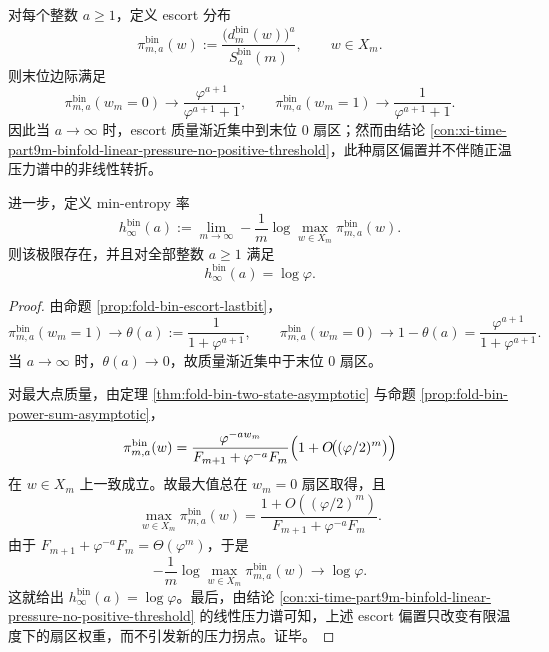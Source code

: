 \begin{conclusion}\label{con:xi-time-part9m-binfold-escort-soft-freezing-minentropy}
对每个整数 \(a\ge 1\)，定义 escort 分布
\[
\pi_{m,a}^{\mathrm{bin}}(w):=
\frac{\bigl(d_m^{\mathrm{bin}}(w)\bigr)^a}{S_a^{\mathrm{bin}}(m)},
\qquad
w\in X_m.
\]
则末位边际满足
\[
\pi_{m,a}^{\mathrm{bin}}(w_m=0)\longrightarrow \frac{\varphi^{a+1}}{\varphi^{a+1}+1},
\qquad
\pi_{m,a}^{\mathrm{bin}}(w_m=1)\longrightarrow \frac{1}{\varphi^{a+1}+1}.
\]
因此当 \(a\to\infty\) 时，escort 质量渐近集中到末位 \(0\) 扇区；然而由结论 \ref{con:xi-time-part9m-binfold-linear-pressure-no-positive-threshold}，此种扇区偏置并不伴随正温压力谱中的非线性转折。

进一步，定义 min-entropy 率
\[
h_{\infty}^{\mathrm{bin}}(a):=
\lim_{m\to\infty}
-\frac{1}{m}\log\max_{w\in X_m}\pi_{m,a}^{\mathrm{bin}}(w).
\]
则该极限存在，并且对全部整数 \(a\ge 1\) 满足
\[
h_{\infty}^{\mathrm{bin}}(a)=\log\varphi.
\]
\end{conclusion}
\begin{proof}
由命题 \ref{prop:fold-bin-escort-lastbit}，
\[
\pi_{m,a}^{\mathrm{bin}}(w_m=1)\to \theta(a):=\frac{1}{1+\varphi^{a+1}},
\qquad
\pi_{m,a}^{\mathrm{bin}}(w_m=0)\to 1-\theta(a)=\frac{\varphi^{a+1}}{1+\varphi^{a+1}}.
\]
当 \(a\to\infty\) 时，\(\theta(a)\to 0\)，故质量渐近集中于末位 \(0\) 扇区。

对最大点质量，由定理 \ref{thm:fold-bin-two-state-asymptotic} 与命题 \ref{prop:fold-bin-power-sum-asymptotic}，
\[
\pi_{m,a}^{\mathrm{bin}}(w)
=
\frac{\varphi^{-aw_m}}{F_{m+1}+\varphi^{-a}F_m}
\Bigl(1+O\!\bigl((\varphi/2)^m\bigr)\Bigr)
\]
在 \(w\in X_m\) 上一致成立。故最大值总在 \(w_m=0\) 扇区取得，且
\[
\max_{w\in X_m}\pi_{m,a}^{\mathrm{bin}}(w)
=
\frac{1+O((\varphi/2)^m)}{F_{m+1}+\varphi^{-a}F_m}.
\]
由于 \(F_{m+1}+\varphi^{-a}F_m=\Theta(\varphi^m)\)，于是
\[
-\frac{1}{m}\log\max_{w\in X_m}\pi_{m,a}^{\mathrm{bin}}(w)\to \log\varphi.
\]
这就给出 \(h_\infty^{\mathrm{bin}}(a)=\log\varphi\)。最后，由结论 \ref{con:xi-time-part9m-binfold-linear-pressure-no-positive-threshold} 的线性压力谱可知，上述 escort 偏置只改变有限温度下的扇区权重，而不引发新的压力拐点。证毕。
\end{proof}

